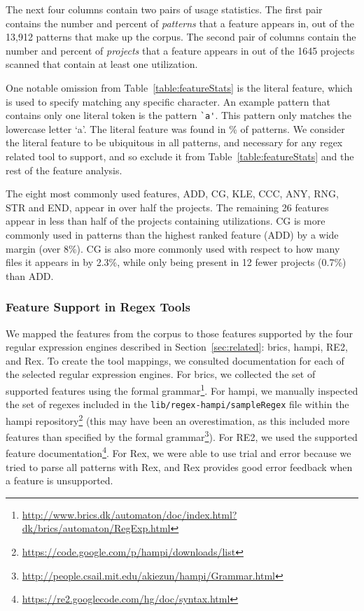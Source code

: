 The next four columns contain two pairs of usage statistics.  The first pair contains the number and percent of \emph{patterns} that a feature appears in, out of the 13,912 patterns that make up the corpus.  The second pair of columns contain the number and percent of \emph{projects} that a feature appears in out of the 1645 projects scanned that contain at least one utilization.

One notable omission from Table~\ref{table:featureStats} is the literal feature, which is used  to specify matching any specific character.  An example pattern that contains only one literal token is the pattern \verb!`a'!.  This pattern only matches the lowercase letter `a'.  The literal feature was found in \% of patterns.
We consider the literal feature to be ubiquitous in all patterns, and necessary for any regex related tool to support, and so exclude it from Table~\ref{table:featureStats} and the rest of the feature analysis.



The eight most commonly used features, ADD, CG, KLE, CCC, ANY, RNG, STR and END,
appear in over half the projects. The remaining 26 features appear in less than half of the projects containing utilizations.
CG is more commonly used in patterns than the highest ranked feature (ADD) by a wide margin (over 8\%).  CG is also more commonly used with respect to how many files it appears in by 2.3\%, while only being present in 12 fewer projects (0.7\%) than ADD.

\subsubsection{Feature Support in Regex Tools}
 We  mapped the features from the corpus to those features supported by the four regular expression engines described in Section~\ref{sec:related}: brics, hampi, RE2, and Rex.
To create the tool mappings, we consulted documentation for each of the selected regular expression engines. For brics, we collected the set of supported features using the formal grammar\footnote{\url{http://www.brics.dk/automaton/doc/index.html?dk/brics/automaton/RegExp.html}}.  For hampi, we manually inspected the set of regexes included in the {\tt lib/regex-hampi/sampleRegex} file within the hampi repository\footnote{\url{https://code.google.com/p/hampi/downloads/list}} (this may have been an overestimation, as this included more features than specified by the formal grammar\footnote{\url{http://people.csail.mit.edu/akiezun/hampi/Grammar.html}}).  For RE2, we used the  supported feature documentation\footnote{\url{https://re2.googlecode.com/hg/doc/syntax.html}}.  For Rex, we were able to use trial and error because we tried to parse all patterns with Rex, and Rex provides good error feedback when a feature is unsupported.

